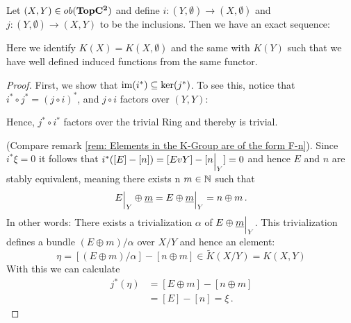 \begin{lemma} \label{lem: Exact part for pairs}
	Let $(X,Y)\in ob(\operatorname{\mathbf{TopC^2}})$ and define $i:(Y,\emptyset) \to (X,\emptyset)$ and $j:(Y,\emptyset)\to(X,Y)$ to be the inclusions. Then we have an exact sequence:
	\begin{center}
	\end{center}
	Here we identify $K(X)=K(X,\emptyset)$ and the same with $K(Y)$ such that we have well defined induced functions from the same functor.
\end{lemma}
\begin{proof}
	First, we show that $\mathrm{im}(i^*)\subseteq \ker(j^*)$. To see this, notice that $i^*\circ j^*=(j\circ i)^*$, and $j\circ i$ factors over $(Y,Y)$:
	\begin{center}
	\end{center} Hence, $j^*\circ i^*$ factors over the trivial Ring and thereby is trivial.
	
	 (Compare remark \ref{rem: Elements in the K-Group are of the form F-n}). Since $i^*\xi=0$ it follows that $i^*([E]-[n])=[{E}v{Y}]-[{n}\einsch{Y}]=0$ and hence $E$ and $n$ are stably equivalent, meaning there exists n $m\in \mathbb{N}$ such that
	\begin{equation*}
		{E}\einsch{Y}\oplus \underline{m}= {E\oplus \underline{m}}\einsch{Y}=n\oplus m \,.
	\end{equation*} 
	In other words: There exists a trivialization $\alpha$ of ${E\oplus \underline{m}}\einsch{Y}$. 
	This trivialization defines a bundle $(E\oplus m)\slash \alpha$ over $X\slash Y$ and hence an element: 
	\begin{equation*}
		\eta=[(E\oplus m)\slash \alpha]-[n\oplus m]\in \tilde{K}(X\slash Y)=K(X,Y)
	\end{equation*}
	With this we can calculate
	\begin{align*}
		j^*(\eta)&=[E\oplus m]-[n\oplus m]\\
		&=[E]-[n]=\xi \, .
	\end{align*}    
\end{proof}
